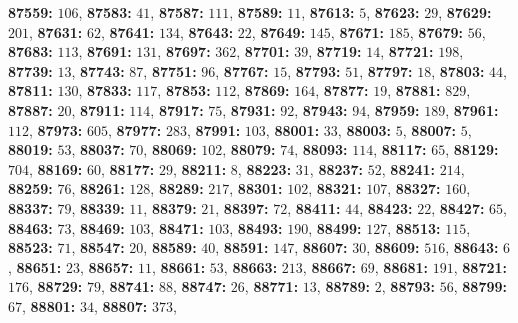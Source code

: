 \textsf{\bfseries 87559:} $106$, \textsf{\bfseries 87583:} $41$, \textsf{\bfseries 87587:} $111$, \textsf{\bfseries 87589:} $11$, \textsf{\bfseries 87613:} $5$, \textsf{\bfseries 87623:} $29$, \textsf{\bfseries 87629:} $201$, \textsf{\bfseries 87631:} $62$, \textsf{\bfseries 87641:} $134$, \textsf{\bfseries 87643:} $22$, \textsf{\bfseries 87649:} $145$, \textsf{\bfseries 87671:} $185$, \textsf{\bfseries 87679:} $56$, \textsf{\bfseries 87683:} $113$, \textsf{\bfseries 87691:} $131$, \textsf{\bfseries 87697:} $362$, \textsf{\bfseries 87701:} $39$, \textsf{\bfseries 87719:} $14$, \textsf{\bfseries 87721:} $198$, \textsf{\bfseries 87739:} $13$, \textsf{\bfseries 87743:} $87$, \textsf{\bfseries 87751:} $96$, \textsf{\bfseries 87767:} $15$, \textsf{\bfseries 87793:} $51$, \textsf{\bfseries 87797:} $18$, \textsf{\bfseries 87803:} $44$, \textsf{\bfseries 87811:} $130$, \textsf{\bfseries 87833:} $117$, \textsf{\bfseries 87853:} $112$, \textsf{\bfseries 87869:} $164$, \textsf{\bfseries 87877:} $19$, \textsf{\bfseries 87881:} $829$, \textsf{\bfseries 87887:} $20$, \textsf{\bfseries 87911:} $114$, \textsf{\bfseries 87917:} $75$, \textsf{\bfseries 87931:} $92$, \textsf{\bfseries 87943:} $94$, \textsf{\bfseries 87959:} $189$, \textsf{\bfseries 87961:} $112$, \textsf{\bfseries 87973:} $605$, \textsf{\bfseries 87977:} $283$, \textsf{\bfseries 87991:} $103$, \textsf{\bfseries 88001:} $33$, \textsf{\bfseries 88003:} $5$, \textsf{\bfseries 88007:} $5$, \textsf{\bfseries 88019:} $53$, \textsf{\bfseries 88037:} $70$, \textsf{\bfseries 88069:} $102$, \textsf{\bfseries 88079:} $74$, \textsf{\bfseries 88093:} $114$, \textsf{\bfseries 88117:} $65$, \textsf{\bfseries 88129:} $704$, \textsf{\bfseries 88169:} $60$, \textsf{\bfseries 88177:} $29$, \textsf{\bfseries 88211:} $8$, \textsf{\bfseries 88223:} $31$, \textsf{\bfseries 88237:} $52$, \textsf{\bfseries 88241:} $214$, \textsf{\bfseries 88259:} $76$, \textsf{\bfseries 88261:} $128$, \textsf{\bfseries 88289:} $217$, \textsf{\bfseries 88301:} $102$, \textsf{\bfseries 88321:} $107$, \textsf{\bfseries 88327:} $160$, \textsf{\bfseries 88337:} $79$, \textsf{\bfseries 88339:} $11$, \textsf{\bfseries 88379:} $21$, \textsf{\bfseries 88397:} $72$, \textsf{\bfseries 88411:} $44$, \textsf{\bfseries 88423:} $22$, \textsf{\bfseries 88427:} $65$, \textsf{\bfseries 88463:} $73$, \textsf{\bfseries 88469:} $103$, \textsf{\bfseries 88471:} $103$, \textsf{\bfseries 88493:} $190$, \textsf{\bfseries 88499:} $127$, \textsf{\bfseries 88513:} $115$, \textsf{\bfseries 88523:} $71$, \textsf{\bfseries 88547:} $20$, \textsf{\bfseries 88589:} $40$, \textsf{\bfseries 88591:} $147$, \textsf{\bfseries 88607:} $30$, \textsf{\bfseries 88609:} $516$, \textsf{\bfseries 88643:} $6$, \textsf{\bfseries 88651:} $23$, \textsf{\bfseries 88657:} $11$, \textsf{\bfseries 88661:} $53$, \textsf{\bfseries 88663:} $213$, \textsf{\bfseries 88667:} $69$, \textsf{\bfseries 88681:} $191$, \textsf{\bfseries 88721:} $176$, \textsf{\bfseries 88729:} $79$, \textsf{\bfseries 88741:} $88$, \textsf{\bfseries 88747:} $26$, \textsf{\bfseries 88771:} $13$, \textsf{\bfseries 88789:} $2$, \textsf{\bfseries 88793:} $56$, \textsf{\bfseries 88799:} $67$, \textsf{\bfseries 88801:} $34$, \textsf{\bfseries 88807:} $373$, 
